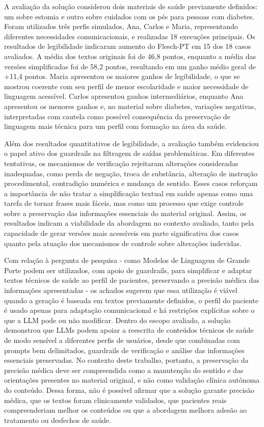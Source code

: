 A avaliação da solução considerou dois materiais de saúde previamente definidos: um sobre estomia e outro sobre cuidados com os pés para pessoas com diabetes. Foram utilizados três perfis simulados, Ana, Carlos e Maria, representando diferentes necessidades comunicacionais, e realizadas 18 execuções principais. Os resultados de legibilidade indicaram aumento do Flesch-PT em 15 dos 18 casos avaliados. A média dos textos originais foi de 46,8 pontos, enquanto a média das versões simplificadas foi de 58,2 pontos, resultando em um ganho médio geral de +11,4 pontos. Maria apresentou os maiores ganhos de legibilidade, o que se mostrou coerente com seu perfil de menor escolaridade e maior necessidade de linguagem acessível. Carlos apresentou ganhos intermediários, enquanto Ana apresentou os menores ganhos e, no material sobre diabetes, variações negativas, interpretadas com cautela como possível consequência da preservação de linguagem mais técnica para um perfil com formação na área da saúde.

Além dos resultados quantitativos de legibilidade, a avaliação também evidenciou o papel ativo dos guardrails na filtragem de saídas problemáticas. Em diferentes tentativas, os mecanismos de verificação rejeitaram alterações consideradas inadequadas, como perda de negação, troca de substância, alteração de instrução procedimental, contradição numérica e mudança de sentido. Esses casos reforçam a importância de não tratar a simplificação textual em saúde apenas como uma tarefa de tornar frases mais fáceis, mas como um processo que exige controle sobre a preservação das informações essenciais do material original. Assim, os resultados indicam a viabilidade da abordagem no contexto avaliado, tanto pela capacidade de gerar versões mais acessíveis em parte significativa dos casos quanto pela atuação dos mecanismos de controle sobre alterações indevidas.

Com relação à pergunta de pesquisa - como Modelos de Linguagem de Grande Porte podem ser utilizados, com apoio de guardrails, para simplificar e adaptar textos técnicos de saúde ao perfil de pacientes, preservando a precisão médica das informações apresentadas - os achados sugerem que essa utilização é viável quando a geração é baseada em textos previamente definidos, o perfil do paciente é usado apenas para adaptação comunicacional e há restrições explícitas sobre o que a LLM pode ou não modificar. Dentro do escopo avaliado, a solução demonstrou que LLMs podem apoiar a reescrita de conteúdos técnicos de saúde de modo sensível a diferentes perfis de usuários, desde que combinadas com prompts bem delimitados, guardrails de verificação e análise das informações essenciais preservadas. No contexto deste trabalho, portanto, a preservação da precisão médica deve ser compreendida como a manutenção do sentido e das orientações presentes no material original, e não como validação clínica autônoma do conteúdo. Dessa forma, não é possível afirmar que a solução garante precisão médica, que os textos foram clinicamente validados, que pacientes reais compreenderiam melhor os conteúdos ou que a abordagem melhora adesão ao tratamento ou desfechos de saúde.

